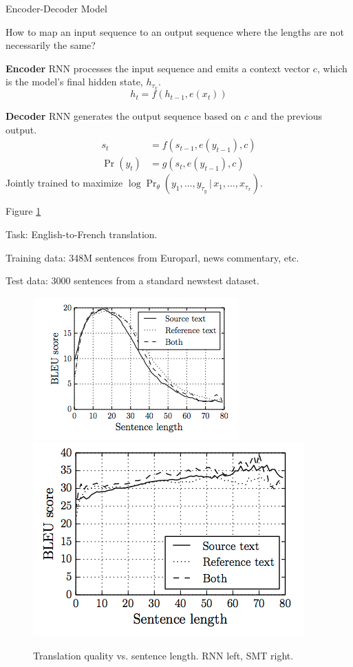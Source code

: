 \documentclass[english]{article}
\begin{document}
\item 
 {Encoder-Decoder Model}

How to map an input sequence to an output sequence where the lengths are not necessarily the same?
 
\textbf{Encoder} RNN processes the input sequence and emits a context vector $c$, which is the model's final hidden state, $h_{\tau_x}$.
$$h_t = f(h_{t-1},e(x_t))$$

\textbf{Decoder} RNN generates the output sequence based on $c$ and the previous output.
\begin{align*}
s_t &= f(s_{t-1}, e(y_{t-1}), c)\\
\Pr(y_t) &= g(s_t, e(y_{t-1}), c)
\end{align*}
Jointly trained to maximize $\log{\Pr_\theta(y_1,\dots,y_{\tau_y}\,|\,x_1,\dots,x_{\tau_x})}$.
 

\item  Figure \ref{Encoder-Decoder Model}

Task: English-to-French translation.

Training data: 348M sentences from Europarl, news commentary, etc.

Test data: 3000 sentences from a standard newstest dataset.
\begin{figure}
\centering
\includegraphics[height=0.3\linewidth]{encdec-smt1.png}
\includegraphics[height=0.3\linewidth]{encdec-smt2.png}
\caption{Translation quality vs. sentence length. RNN left, SMT right.}
\label{Encoder-Decoder Model}
\end{figure}
\end{document}
